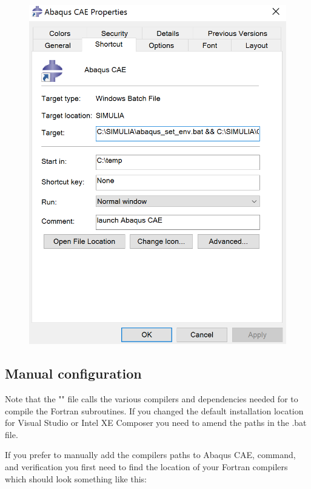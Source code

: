 \documentclass[10pt,a4paper,oneside]{article}
\begin{document}
\begin{figure}[!h]
\centering
\includegraphics[scale=0.7]{abaqus_CAE.png} 
\caption{}
\label{fig:CAEpath}
\end{figure}

\subsection{Manual configuration}
Note that the "" file calls the various compilers and dependencies needed for to compile the Fortran subroutines. If you changed the default installation location for Visual Studio or Intel XE Composer  you need to amend the paths in the .bat file. 

If you prefer to manually add the compilers paths to Abaqus CAE, command, and verification you first need to find the location of your Fortran compilers which should look something like this: 
\bigbreak
{}\newline
{} 
\bigbreak
{}\newline
{}
\bigbreak
\end{document}
